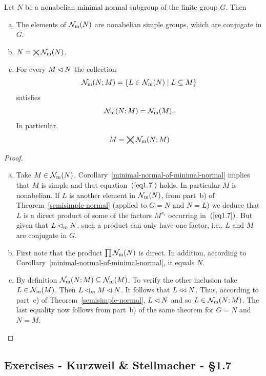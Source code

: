 \begin{cor}
    Let\/ $N$ be a nonabelian minimal normal subgroup of the finite group\/ $G$.  Then
    \begin{enumerate}[a),font=\upshape]
        \item The elements of\/ $\operatorname{{\cal N}_m}(N)$ are nonabelian simple groups, which are conjugate in\/ $G$.
        \item $N = \bigtimes\operatorname{{\cal N}_m}(N)$.
        \item For every\/ $M\lhd N$ the collection
        $$
            \operatorname{{\cal N}_m}(N;M)=\{L\in\operatorname{{\cal N}_m}(N)\mid L\subseteq M\}
        $$
        satisfies
        $$
            \operatorname{{\cal N}_m}(N;M) = \operatorname{{\cal N}_m}(M).
        $$
        In particular,
        $$
            M = \bigtimes\operatorname{{\cal N}_m}(N;M)
        $$
    \end{enumerate}
\end{cor}

\begin{proof}\ 
\begin{enumerate}[a),font=\upshape]
    \item Take $M\in\operatorname{{\cal N}_m}(N)$. Corollary~\ref{minimal-normal-of-minimal-normal} implies that $M$ is simple and that equation~$(\ref{eq1.7})$ holds. In particular $M$ is nonabelian. If $L$ is another element in $\operatorname{{\cal N}_m}(N)$, from part~b) of Theorem~\ref{semisimple-normal} (applied to $G=N$ and $N=L$) we deduce that $L$ is a direct product of some of the factors $M^{x_i}$ occurring in~$(\ref{eq1.7})$. But given that $L\lhd_mN$, such a product can only have one factor, i.e., $L$ and $M$ are conjugate in $G$.

    \item First note that the product $\prod\operatorname{{\cal N}_m}(N)$ is direct. In addition, according to Corollary~\ref{minimal-normal-of-minimal-normal}, it equals $N$.

    \item By definition $\operatorname{{\cal N}_m}(N;M)\subseteq\operatorname{{\cal N}_m}(M)$. To verify the other inclusion take $L\in\operatorname{{\cal N}_m}(M)$. Then $L\lhd_m M\lhd N$. It follows that $L\mathrel{\triangleleft\triangleleft} N$. Thus, according to part~c) of Theorem~\ref{semisimple-normal}, $L\lhd N$ and so $L\in\operatorname{{\cal N}_m}(N;M)$. The last equality now follows from part~b) of the same theorem for $G=N$ and $N=M$.
\end{enumerate}
\end{proof}

\subsection{Exercises - Kurzweil \& Stellmacher - \S 1.7}


